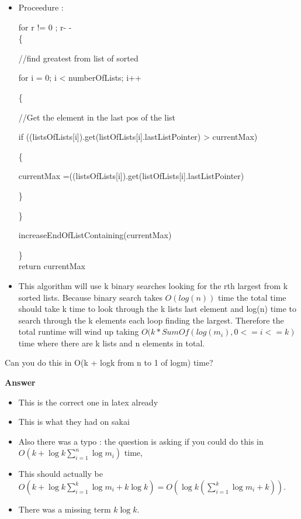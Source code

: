 \documentclass{article}
\begin{document}
\begin{enumerate}
\begin{itemize}
\item Proceedure : 

for r != 0 ; r- -\\
\{

\qquad //find greatest from list of sorted

\qquad for i = 0; i < numberOfLists; i++

\qquad \{

\qquad \qquad //Get the element in the last pos of the list

\qquad \qquad if ((listsOfLists[i]).get(listOfLists[i].lastListPointer) > currentMax)

\qquad \qquad \{

\qquad \qquad \qquad currentMax =((listsOfLists[i]).get(listOfLists[i].lastListPointer)

\qquad \qquad \}

\qquad \}

\qquad increaseEndOfListContaining(currentMax)

\}\\
return currentMax\\

\item This algorithm will use k binary searches looking for the rth largest from k sorted lists. Because binary search takes $O(log(n))$ time the total time should take k time to look through the k lists last element and log(n) time to search through the k elements each loop finding the largest. Therefore the total runtime will wind up taking $O(k * SumOf( log(m_{i}), 0 <= i <= k)$ time where there are k lists and n elements in total.
\end{itemize}

Can you do this in O(k + logk from n to 1 of logm) time?

\textbf{ Answer }
\begin{itemize}
\item This is the correct one in latex already
\item This is what they had on sakai
\item Also there was a typo : the question is asking if you could do this in $O(k+\log k \sum_{i=1}^{n}\log m_{i})$ time,
\item This should actually be $O(k+\log k \sum_{i=1}^{k}\log m_{i}+k\log k) = O(\log k (\sum_{i=1}^{k}\log m_{i}+k))$.
\item There was a missing term $k\log k$.
\end{itemize}

\end{enumerate}
\end{document}

